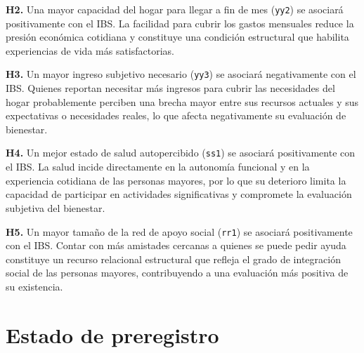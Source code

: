 \documentclass[
  spanish,
  a4paper,
  oneside]{scrbook}
\begin{document}
\textbf{H2.} Una mayor capacidad del hogar para llegar a fin de mes
(\texttt{yy2}) se asociará positivamente con el IBS. La facilidad para
cubrir los gastos mensuales reduce la presión económica cotidiana y
constituye una condición estructural que habilita experiencias de vida
más satisfactorias.

\textbf{H3.} Un mayor ingreso subjetivo necesario (\texttt{yy3}) se
asociará negativamente con el IBS. Quienes reportan necesitar más
ingresos para cubrir las necesidades del hogar probablemente perciben
una brecha mayor entre sus recursos actuales y sus expectativas o
necesidades reales, lo que afecta negativamente su evaluación de
bienestar.

\textbf{H4.} Un mejor estado de salud autopercibido (\texttt{ss1}) se
asociará positivamente con el IBS. La salud incide directamente en la
autonomía funcional y en la experiencia cotidiana de las personas
mayores, por lo que su deterioro limita la capacidad de participar en
actividades significativas y compromete la evaluación subjetiva del
bienestar.

\textbf{H5.} Un mayor tamaño de la red de apoyo social (\texttt{rr1}) se
asociará positivamente con el IBS. Contar con más amistades cercanas a
quienes se puede pedir ayuda constituye un recurso relacional
estructural que refleja el grado de integración social de las personas
mayores, contribuyendo a una evaluación más positiva de su existencia.

\section{Estado de preregistro}\label{estado-de-preregistro}
\end{document}
